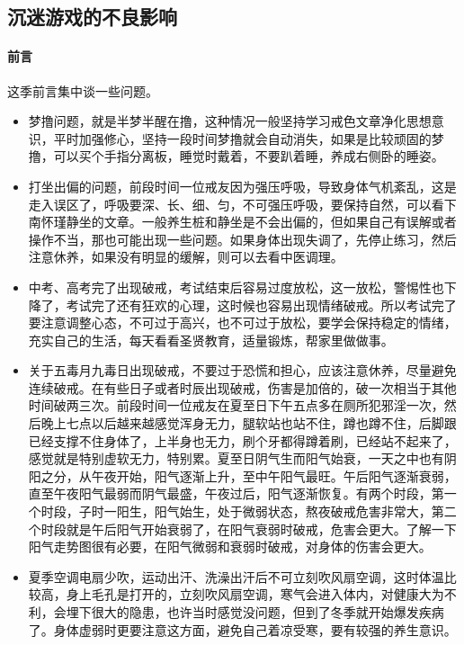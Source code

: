 \subsection{沉迷游戏的不良影响}\label{134}

\paragraph*{前言}

这季前言集中谈一些问题。

\begin{itemize}
    \item 梦撸问题，就是半梦半醒在撸，这种情况一般坚持学习戒色文章净化思想意识，平时加强修心，坚持一段时间梦撸就会自动消失，如果是比较顽固的梦撸，可以买个手指分离板，睡觉时戴着，不要趴着睡，养成右侧卧的睡姿。
    \item 打坐出偏的问题，前段时间一位戒友因为强压呼吸，导致身体气机紊乱，这是走入误区了，呼吸要深、长、细、匀，不可强压呼吸，要保持自然，可以看下南怀瑾静坐的文章。一般养生桩和静坐是不会出偏的，但如果自己有误解或者操作不当，那也可能出现一些问题。如果身体出现失调了，先停止练习，然后注意休养，如果没有明显的缓解，则可以去看中医调理。
    \item 中考、高考完了出现破戒，考试结束后容易过度放松，这一放松，警惕性也下降了，考试完了还有狂欢的心理，这时候也容易出现情绪破戒。所以考试完了要注意调整心态，不可过于高兴，也不可过于放松，要学会保持稳定的情绪，充实自己的生活，每天看看圣贤教育，适量锻炼，帮家里做做事。
    \item 关于五毒月九毒日出现破戒，不要过于恐慌和担心，应该注意休养，尽量避免连续破戒。在有些日子或者时辰出现破戒，伤害是加倍的，破一次相当于其他时间破两三次。前段时间一位戒友在夏至日下午五点多在厕所犯邪淫一次，然后晚上七点以后越来越感觉浑身无力，腿软站也站不住，蹲也蹲不住，后脚跟已经支撑不住身体了，上半身也无力，刷个牙都得蹲着刷，已经站不起来了，感觉就是特别虚软无力，特别累。夏至日阴气生而阳气始衰，一天之中也有阴阳之分，从午夜开始，阳气逐渐上升，至中午阳气最旺。午后阳气逐渐衰弱，直至午夜阳气最弱而阴气最盛，午夜过后，阳气逐渐恢复。有两个时段，第一个时段，子时一阳生，阳气始生，处于微弱状态，熬夜破戒危害非常大，第二个时段就是午后阳气开始衰弱了，在阳气衰弱时破戒，危害会更大。了解一下阳气走势图很有必要，在阳气微弱和衰弱时破戒，对身体的伤害会更大。
    \item 夏季空调电扇少吹，运动出汗、洗澡出汗后不可立刻吹风扇空调，这时体温比较高，身上毛孔是打开的，立刻吹风扇空调，寒气会进入体内，对健康大为不利，会埋下很大的隐患，也许当时感觉没问题，但到了冬季就开始爆发疾病了。身体虚弱时更要注意这方面，避免自己着凉受寒，要有较强的养生意识。

\end{itemize}
